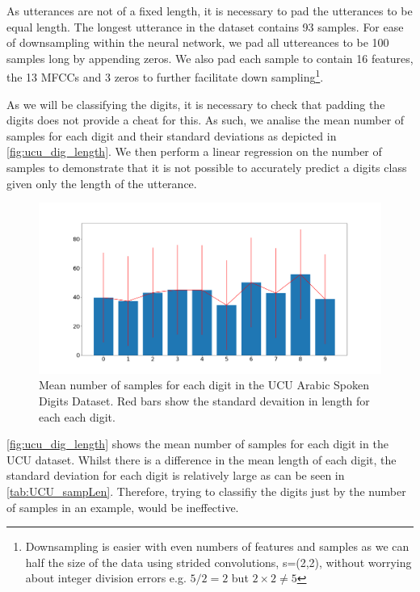 As utterances are not of a fixed length, it is necessary to pad the utterances to be equal length. The longest utterance in the dataset contains 93 samples. For ease of downsampling within the neural network, we pad all uttereances to be 100 samples long by appending zeros. We also pad each sample to contain 16 features, the 13 MFCCs and 3 zeros to further facilitate down sampling\footnote{Downsampling is easier with even numbers of features and samples as we can half the size of the data using strided convolutions, s=(2,2), without worrying about integer division errors e.g. $5/2=2$ but $2\times2 \neq5$}.

As we will be classifying the digits, it is necessary to check that padding the digits does not provide a cheat for this. As such, we analise the mean number of samples for each digit and their standard deviations as depicted in \autoref{fig:ucu_dig_length}. We then perform a linear regression on the number of samples to demonstrate that it is not possible to accurately predict a digits class given only the length of the utterance.

\begin{figure}
	\includegraphics[width=\textwidth]{./Figs/mnistSpoken/UCU_digit_length.png}
	\caption{Mean number of samples for each digit in the UCU Arabic Spoken Digits Dataset. Red bars show the standard devaition in length for each each digit.}
	\label{fig:ucu_dig_length}

\end{figure}

\autoref{fig:ucu_dig_length} shows the mean number of samples for each digit in the UCU dataset. Whilst there is a difference in the mean length of each digit, the standard deviation for each digit is relatively large as can be seen in \autoref{tab:UCU_sampLen}. Therefore, trying to classifiy the digits just by the number of samples in an example, would be ineffective.

